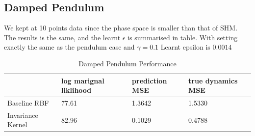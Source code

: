 \documentclass{statsmsc}
\begin{document}
\subsection{Damped Pendulum}
We kept at 10 points data since the phase space is smaller than that of SHM. 
The results is the same, and the learnt $\epsilon$ is summarised in table. With setting exactly the same as the pendulum case and $\gamma=0.1$
Learnt epsilon is $0.0014$
\begin{table}[H]
  \centering
  \begin{tabular}{l l l l}
    \hline
                    & log marignal liklihood & prediction MSE & true dynamics MSE\\
    \hline
Baseline RBF & 77.61 & 1.3642 & 1.5330 \\
Invariance Kernel & 82.96 & 0.1029 & 0.4788 \\

    \hline
  \end{tabular}
  \caption{Damped Pendulum Performance}
  \label{tab:damped_pendulum_performance}
\end{table}
\end{document}
